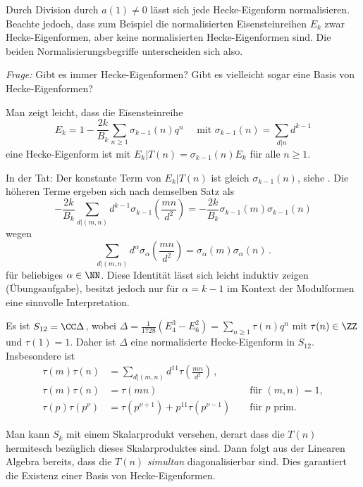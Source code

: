 \begin{beme}
Durch Division durch $a(1) \neq 0$ lässt sich jede Hecke-Eigenform normalisieren. Beachte jedoch, dass zum Beispiel die \glqq{}normalisierten Eisensteinreihen\grqq{} $E_k$ zwar Hecke-Eigenformen, aber keine normalisierten Hecke-Eigenformen sind. Die beiden Normalisierungsbegriffe unterscheiden sich also.
\end{beme}

\emph{Frage:} Gibt es immer Hecke-Eigenformen? Gibt es vielleicht sogar eine Basis von Hecke-Eigenformen?

\begin{beme-list}
\item Man zeigt \glqq{}leicht\grqq{}, dass die Eisensteinreihe \[
E_k = 1 - \frac{2k}{B_k} \sum_{n \geq 1} \sigma_{k-1} (n) q^n \quad \text{ mit } \sigma_{k-1} (n) = \sum_{d \vert n} d^{k-1}
\]
eine Hecke-Eigenform ist mit $E_k | T(n) = \sigma_{k-1}(n) E_k$ für alle $n \geq 1$.

In der Tat: Der konstante Term von $E_k | T(n)$ ist gleich $\sigma_{k-1}(n)$, siehe . Die höheren Terme ergeben sich nach demselben Satz als 
\[
- \frac{2k}{B_k} \sum_{d \vert (m,n)} d^{k-1} \sigma_{k-1} \left(\frac{mn}{d^2}\right) = - \frac{2k}{B_k} \sigma_{k-1}(m) \sigma_{k-1}(n)
\]
wegen
\[
\sum_{d \vert (m,n)} d^\alpha \sigma_\alpha \left(\frac{mn}{d^2}\right) = \sigma_\alpha(m) \sigma_\alpha(n)
\,.
\]
für beliebiges $\alpha \in \NN$. Diese Identität lässt sich leicht induktiv zeigen (Übungsaufgabe), besitzt jedoch nur für $\alpha = k - 1$ im Kontext der Modulformen eine sinnvolle Interpretation.
\item Es ist $S_{12} = \CC \Delta$, wobei $\Delta = \frac {1}{1728} (E_4^3 - E_6^2) = \sum_{n \geq 1} \tau(n) q^n$ mit $\tau (n) \in \ZZ$ und $\tau(1) = 1$. Daher ist $\Delta$ eine normalisierte Hecke-Eigenform in $S_{12}$. Insbesondere ist
\begin{align*}
\tau(m) \tau(n) &= \sum_{d \vert (m,n)} d^{11} \tau \left( \frac {mn}{d^2} \right)\,,\\
\tau(m) \tau(n) &= \tau(mn) &&\text{ für } (m,n) = 1,\\
\tau(p) \tau(p^\nu) &= \tau(p^{\nu+1}) + p^{11} \tau(p^{\nu-1}) &&\text{ für } p \text{ prim.}
\end{align*}
\item Man kann $S_k$ mit einem Skalarprodukt versehen, derart dass die $T(n)$ hermitesch bezüglich dieses Skalarproduktes sind. Dann folgt aus der Linearen Algebra bereits, dass die $T(n)$ \emph{simultan} diagonalisierbar sind. Dies garantiert die Existenz einer Basis von Hecke-Eigenformen.
\end{beme-list}

